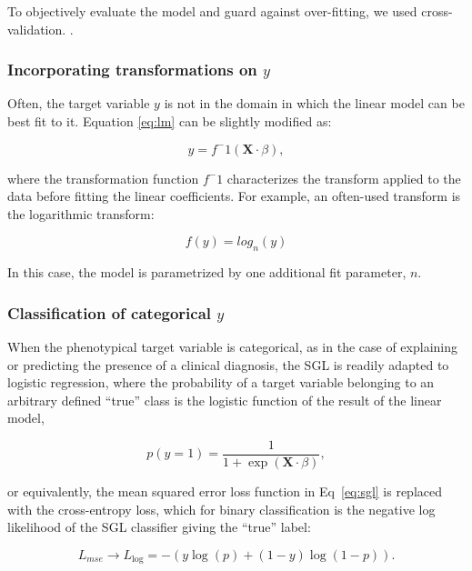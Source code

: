 To objectively evaluate the model and guard against over-fitting, we used
cross-validation. .

\subsubsection*{Incorporating transformations on $y$}

Often, the target variable $y$ is not in the domain in which the linear model
can be best fit to it. Equation \ref{eq:lm} can be slightly modified as:

\begin{equation}
y = f^-1(\mathbf{X} \cdot \beta),
\label{eq:lm}
\end{equation}

where the transformation function $f^-1$ characterizes the transform applied to
the data before fitting the linear coefficients. For example, an often-used
transform is the logarithmic transform:

\begin{equation}
f(y) = log_n(y)
\label{eq:log_nonlinearity}
\end{equation}

In this case, the model is parametrized by one additional fit parameter, $n$.

\subsubsection*{Classification of categorical $y$}
When the phenotypical target variable is categorical, as in the case of
explaining or predicting the presence of a clinical diagnosis, the SGL is
readily adapted to logistic regression, where the probability of a target
variable belonging to an arbitrary defined ``true'' class is the logistic
function of the result of the linear model,

\begin{equation}
    p(y = 1) = \frac{1}{1 + \exp(\mathbf{X}\cdot \beta)},
    \label{eq:logit}
\end{equation}

or equivalently, the mean squared error loss function in Eq~\eqref{eq:sgl} is
replaced with the cross-entropy loss, which for binary classification is the
negative log likelihood of the SGL classifier giving the ``true'' label:

\begin{equation}
    L_{mse} \rightarrow L_{\log} = -\left(y \log(p) + (1 - y) \log(1 - p)\right).
    \label{eq:logloss}
\end{equation}


